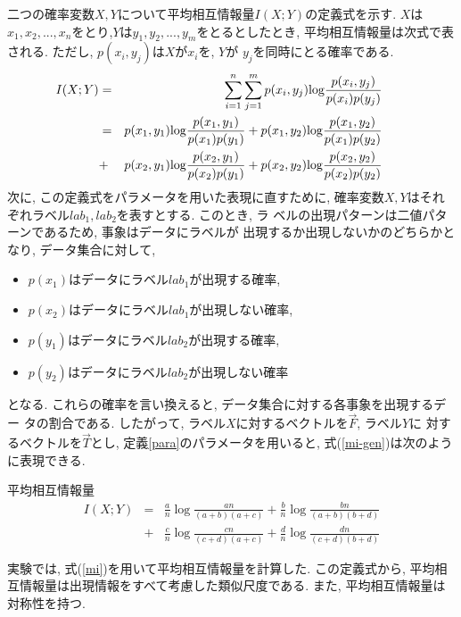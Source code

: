 二つの確率変数$X,Y$について平均相互情報量$I(X;Y)$の定義式を示す. 
$X$は$x_1,x_2,...,x_n$をとり,$Y$は$y_1,y_2,...,y_m$をとるとしたとき, 
平均相互情報量は次式で表される. ただし, $p(x_i,y_j)$は$X$が$x_i$を, $Y$が
$y_j$を同時にとる確率である. 
\begin{eqnarray}
\mbox{\hspace*{-2em}}
I(X;Y)&=&\sum_{i=1}^n\sum_{j=1}^mp(x_i,y_j){\log}\frac{p(x_i,y_j)}{p(x_i)p(y_j)}
\label{mi-gen} \\
\mbox{\hspace*{-2em}}
&=&p(x_1,y_1){\log}\frac{p(x_1,y_1)}{p(x_1)p(y_1)} 
+p(x_1,y_2){\log}\frac{p(x_1,y_2)}{p(x_1)p(y_2)} \nonumber\\
\mbox{\hspace*{-2em}}
&+&p(x_2,y_1){\log}\frac{p(x_2,y_1)}{p(x_2)p(y_1)}
+p(x_2,y_2){\log}\frac{p(x_2,y_2)}{p(x_2)p(y_2)} 
\label{mi-parts}
\end{eqnarray}
次に, この定義式をパラメータを用いた表現に直すために, 
確率変数$X,Y$はそれぞれラベル$lab_1,lab_2$を表すとする. このとき, ラ
ベルの出現パターンは二値パターンであるため, 事象はデータにラベルが
出現するか出現しないかのどちらかとなり, データ集合に対して, 
\begin{itemize}
\item $p(x_1)$はデータにラベル$lab_1$が出現する確率, 
\item $p(x_2)$はデータにラベル$lab_1$が出現しない確率, 
\item $p(y_1)$はデータにラベル$lab_2$が出現する確率, 
\item $p(y_2)$はデータにラベル$lab_2$が出現しない確率
\end{itemize}
となる. これらの確率を言い換えると, データ集合に対する各事象を出現するデー
タの割合である. したがって, ラベル$X$に対するベクトルを$\vec{F}$, ラベル$Y$に
対するベクトルを$\vec{T}$とし, 定義\ref{para}のパラメータを用いると, 
式(\ref{mi-gen})は次のように表現できる. 
\begin{df} 平均相互情報量
\mbox{\hspace*{-2em}}
\begin{eqnarray}
I(X;Y)&=&\frac{a}{n}{\log}\frac{a n}{(a+b)(a+c)}
+\frac{b}{n}{\log}\frac{b n}{(a+b)(b+d)} \nonumber\\
&+&\frac{c}{n}{\log}\frac{c n}{(c+d)(a+c)}+
\frac{d}{n}{\log}\frac{d n}{(c+d)(b+d)}
\label{mi}
\end{eqnarray}
\end{df}
実験では, 式(\ref{mi})を用いて平均相互情報量を計算した. 
この定義式から, 平均相互情報量は出現情報をすべて考慮した類似尺度である. 
また, 平均相互情報量は対称性を持つ. 

